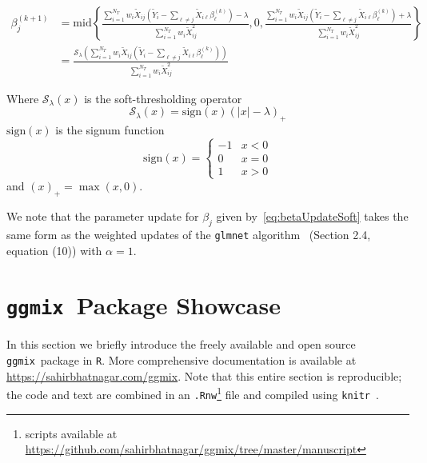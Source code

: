 \documentclass[12pt,letter]{article}\usepackage[]{graphicx}\usepackage[]{color}
\newcommand{\tm}[1]{\textrm{{#1}}}
\newcommand{\ggmix}{\texttt{ggmix}}
\newcommand{\Xtilde}{\widetilde{X}}
\newcommand{\Ytilde}{\widetilde{Y}}
\begin{document}
\begin{align}
	\beta_j^{(k+1)} & = \tm{mid}\left\lbrace \frac{  \sum_{i=1}^{N_T} w_i \Xtilde_{ij}\left(  \Ytilde_i - \sum_{\ell \neq j}\Xtilde_{i\ell} \beta_\ell^{(k)} \right) - \lambda}{\sum_{i=1}^{N_T} w_i \Xtilde_{ij}^2}, 0,\frac{  \sum_{i=1}^{N_T} w_i \Xtilde_{ij}\left(  \Ytilde_i - \sum_{\ell \neq j}\Xtilde_{i\ell} \beta_\ell^{(k)} \right) + \lambda}{\sum_{i=1}^{N_T} w_i \Xtilde_{ij}^2} \right\rbrace \nonumber \\
	& = \frac{\mathcal{S}_{\lambda}\left( \sum_{i=1}^{N_T} w_i \Xtilde_{ij}\left(  \Ytilde_i - \sum_{\ell \neq j}\Xtilde_{i\ell} \beta_\ell^{(k)} \right)\right) }{\sum_{i=1}^{N_T} w_i \Xtilde_{ij}^2} \label{eq:betaUpdateSoft}
\end{align}

Where $\mathcal{S}_{\lambda}(x)$ is the soft-thresholding operator
\begin{equation*}
	\mathcal{S}_{\lambda}(x) = \tm{sign}(x)(|x| - \lambda)_+
\end{equation*}
$\textrm{sign}(x)$ is the signum function
\begin{equation*}
	\textrm{sign}(x) = \begin{cases}
		-1 & x<0\\
		0 & x= 0\\
		1 & x>0
	\end{cases}
\end{equation*}
and $(x)_+ = \max(x, 0)$.

We note that the parameter update for $\beta_j$ given by~\eqref{eq:betaUpdateSoft} takes the same form as the weighted updates of the \texttt{glmnet} algorithm~\citep{friedman2010regularization} (Section 2.4, equation (10)) with $\alpha=1$.


\FloatBarrier 

\newpage

\section{\ggmix ~Package Showcase} \label{ap:showcase}

In this section we briefly introduce the freely available and open source \ggmix ~package in \texttt{R}. More comprehensive documentation is available at \url{https://sahirbhatnagar.com/ggmix}. Note that this entire section is reproducible; the code and text are combined in an \texttt{.Rnw}\footnote[1]{scripts available at \url{https://github.com/sahirbhatnagar/ggmix/tree/master/manuscript}} file and compiled using \texttt{knitr}~\citep{xie2015dynamic}. 
\end{document}
